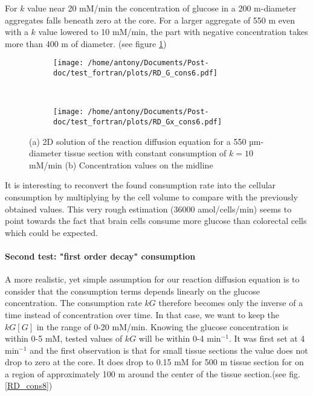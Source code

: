 \documentclass[11pt,a4paper]{article}
\begin{document}
For $k$ value near 20 mM/min the concentration of glucose in a 200 \textmu m-diameter aggregates falls beneath zero at the core. For a larger aggregate of 550 \textmu m even with a $k$ value lowered to 10 mM/min, the part with negative concentration takes more than 400 \textmu m of diameter. (see figure \ref{RD_G_cons6})

 \begin{figure}[ht!]
	\begin{subfigure}{0.45\textwidth}
	\centering
	\texttt{[image: /home/antony/Documents/Post-doc/test\_fortran/plots/RD\_G\_cons6.pdf]}
	\caption{ \label{RD_G_cons6}}
	\end{subfigure}
	~~
	\begin{subfigure}{0.45\textwidth}
	\texttt{[image: /home/antony/Documents/Post-doc/test\_fortran/plots/RD\_Gx\_cons6.pdf]}
		\caption{ \label{RD_Gx_cons6}}
	\end{subfigure}
	\caption{(a) 2D solution of the reaction diffusion equation for a 550 µm-diameter tissue section with constant consumption of $k = 10$ mM/min (b) Concentration values on the midline \label{RD_cons6}}
\end{figure}

It is interesting to reconvert the found consumption rate into the cellular consumption by multiplying by the cell volume to compare with the previously obtained values. This very rough estimation (36000 amol/cells/min) seems to point towards the fact that brain cells consume more glucose than colorectal cells which could be expected. 

\paragraph{Second test: "first order decay" consumption}
A more realistic, yet simple assumption for our reaction diffusion equation is to consider that the consumption terms depends linearly on the glucose concentration. The consumption rate $kG$ therefore becomes only the inverse of a time instead of concentration over time. In that case, we want to keep the $kG [G]$ in the range of 0-20 mM/min. Knowing the glucose concentration is within 0-5 mM, tested values of $kG$ will be within 0-4 min$^{-1}$. It was first set at 4 min$^{-1}$ and the first observation is that for small tissue sections the value does not drop to zero at the core. It does drop to 0.15 mM for 500 \textmu m tissue section for on a region of approximately  100 \textmu  m around the center of the tissue section.(see fig. \ref{RD_cons8})
\end{document}
